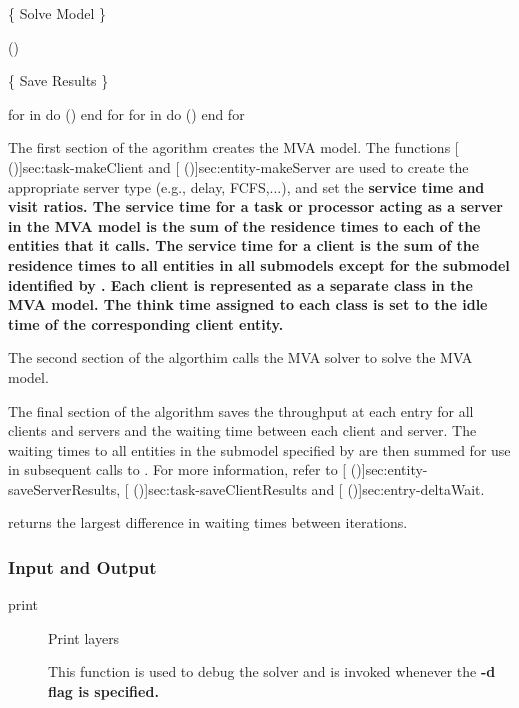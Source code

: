 \begin{description}
\begin{example}
  \{ Solve Model \}

  ()

  \{ Save Results \}

  for  in  do
    ()
  end for
  for  in  do
    ()
  end for
\end{example}

The first section of the agorithm creates the MVA model.  The
functions [ (\Sec\Ref)]{sec:task-makeClient}
and [ (\Sec\Ref)]{sec:entity-makeServer} are
used to create the appropriate server type (e.g., delay, FCFS,...),
and set the \bf{service time} and \bf{visit ratios}.  The service
time for a task or processor acting as a server in the MVA model is
the sum of the residence times to each of the entities that it calls.
The service time for a client is the sum of the residence times to all
entities in all submodels except for the submodel identified by
.  Each client is represented as a separate
\bf{class} in the MVA model.  The \bf{think time} assigned to each
class is set to the idle time of the corresponding client entity.

The second section of the algorthim calls the MVA solver to solve the
MVA model.

The final section of the algorithm saves the throughput at each entry
for all clients and servers and the waiting time between each client
and server.  The waiting times to all entities in the submodel
specified by  are then summed for use in subsequent
calls to .  For more information, refer to
[
(\Sec\Ref)]{sec:entity-saveServerResults},
[
(\Sec\Ref)]{sec:task-saveClientResults} and [
(\Sec\Ref)]{sec:entry-deltaWait}.

 returns the largest difference in waiting times
between iterations.

\end{description}


\subsubsection{Input and Output}
\begin{description}
\item[print] \texonly{---} Print layers \\

This function is used to debug the solver and is invoked whenever the
\bf{-d} flag is specified.

\end{description}

